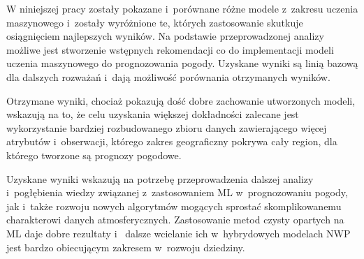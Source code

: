W niniejszej pracy zostały pokazane i~porównane różne modele z~zakresu uczenia
maszynowego i~zostały wyróżnione te, których zastosowanie skutkuje 
osiągnięciem najlepszych wyników. Na podstawie przeprowadzonej analizy 
możliwe jest stworzenie wstępnych rekomendacji co do implementacji
modeli uczenia maszynowego do prognozowania pogody. Uzyskane wyniki są linią bazową
dla dalszych rozważań i~dają możliwość porównania otrzymanych wyników.

Otrzymane wyniki, chociaż pokazują dość dobre zachowanie utworzonych modeli, wskazują na to,
że celu uzyskania większej dokładności zalecane jest wykorzystanie bardziej 
rozbudowanego zbioru danych zawierającego więcej atrybutów i~obserwacji, którego
zakres geograficzny pokrywa cały region, dla którego tworzone są prognozy pogodowe.

Uzyskane wyniki wskazują na potrzebę przeprowadzenia dalszej analizy i~pogłębienia
wiedzy związanej z~zastosowaniem ML w~prognozowaniu pogody, jak i~także 
rozwoju nowych algorytmów mogących sprostać skomplikowanemu charakterowi danych 
atmosferycznych. Zastosowanie metod czysty opartych na ML daje dobre rezultaty i~
dalsze wcielanie ich w~hybrydowych modelach NWP jest bardzo obiecującym 
zakresem w~rozwoju dziedziny.

\pagebreak